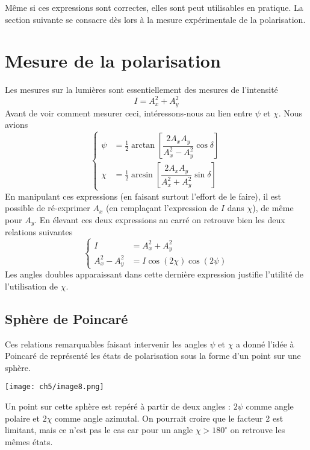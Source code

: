 	Même si ces expressions sont correctes, elles sont peut utilisables en pratique. La section 
	suivante se consacre dès lors à la mesure expérimentale de la polarisation.
	
	\newpage
\section{Mesure de la polarisation}
Les mesures sur la lumières sont essentiellement des mesures de l'intensité
\begin{equation}
I = A_x^2+A_y^2
\end{equation}
Avant de voir comment mesurer ceci, intéressons-nous au lien entre $\psi$ et $\chi$. Nous avions
\begin{equation}
\left\{\begin{array}{ll}
\psi &= \frac{1}{2}\arctan\left[\dfrac{2A_xA_y}{A_x^2-A_y^2}\cos\delta\right]\\
\chi &= \frac{1}{2}\arcsin\left[\dfrac{2A_xA_y}{A_x^2+A_y^2}\sin\delta\right]	
\end{array}\right.
\end{equation}
En manipulant ces expressions (en faisant surtout l'effort de le faire), il est possible de 
ré-exprimer $A_x$ (en remplaçant l'expression de $I$ dans $\chi$), de même pour $A_y$.
En élevant ces deux expressions au carré on retrouve bien les deux relations suivantes 
\begin{equation}
\left\{\begin{array}{ll}
I &= A_x^2+A_y^2\\
A_x^2-A_y^2 &= I\cos(2\chi)\cos(2\psi)
\end{array}\right.
\end{equation}
Les angles doubles apparaissant dans cette dernière expression justifie l'utilité de 
l'utilisation de $\chi$.

	\subsection{Sphère de Poincaré}
	Ces relations remarquables faisant intervenir les angles $\psi$ et $\chi$ a donné l'idée à 
	Poincaré de représenté les états de polarisation sous la forme d'un point sur une sphère. 
	
	\begin{center}
	\texttt{[image: ch5/image8.png]}
	\end{center}
	
	Un point sur cette sphère est repéré à partir de deux angles : $2\psi$ comme angle polaire et 
	$2\chi$ comme angle azimutal. On pourrait croire que le facteur 2 est limitant, mais ce n'est 
	pas le cas car pour un angle $\chi>180^\circ$ on retrouve les mêmes états.\\
	
